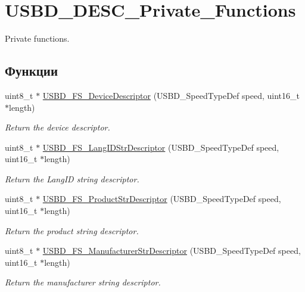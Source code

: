 \hypertarget{group___u_s_b_d___d_e_s_c___private___functions}{
\section{USBD\_\-DESC\_\-Private\_\-Functions}
\label{group___u_s_b_d___d_e_s_c___private___functions}
}
Private functions.  


\subsection*{Функции}
\begin{CompactItemize}
\item 
uint8\_\-t $\ast$ \hyperlink{group___u_s_b_d___d_e_s_c___private___functions_g14798be38c08a37163e53167032485ff}{USBD\_\-FS\_\-DeviceDescriptor} (USBD\_\-SpeedTypeDef speed, uint16\_\-t $\ast$length)
\begin{CompactList}\small\item\em Return the device descriptor. \item\end{CompactList}\item 
uint8\_\-t $\ast$ \hyperlink{group___u_s_b_d___d_e_s_c___private___functions_gc02628ceb6a6a071e192dcb85063c0cc}{USBD\_\-FS\_\-LangIDStrDescriptor} (USBD\_\-SpeedTypeDef speed, uint16\_\-t $\ast$length)
\begin{CompactList}\small\item\em Return the LangID string descriptor. \item\end{CompactList}\item 
uint8\_\-t $\ast$ \hyperlink{group___u_s_b_d___d_e_s_c___private___functions_g0ec558c0303daabb851d584109a56514}{USBD\_\-FS\_\-ProductStrDescriptor} (USBD\_\-SpeedTypeDef speed, uint16\_\-t $\ast$length)
\begin{CompactList}\small\item\em Return the product string descriptor. \item\end{CompactList}\item 
uint8\_\-t $\ast$ \hyperlink{group___u_s_b_d___d_e_s_c___private___functions_g6427a671827813efe1a46c3dfcb05683}{USBD\_\-FS\_\-ManufacturerStrDescriptor} (USBD\_\-SpeedTypeDef speed, uint16\_\-t $\ast$length)
\begin{CompactList}\small\item\em Return the manufacturer string descriptor. \item\end{CompactList}\item 

\end{CompactItemize}
